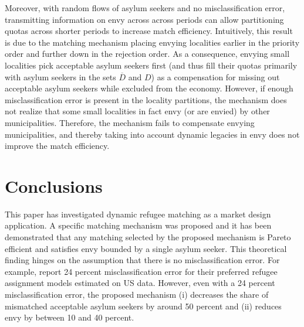 \documentclass[12pt,fleqn]{article}
\begin{document}
Moreover, with random flows of asylum seekers and no misclassification error, transmitting information on envy across across periods can allow partitioning quotas across shorter periods to increase match efficiency. Intuitively, this result is due to the matching mechanism placing envying localities earlier in the priority order and further down in the rejection order. As a consequence, envying small localities pick acceptable asylum seekers first (and thus fill their quotas primarily with asylum seekers in the sets $\overline{D}$ and $D$) as a compensation for missing out acceptable asylum seekers while excluded from the economy. However, if enough misclassification error is present in the locality partitions, the mechanism does not realize that some small localities in fact envy (or are envied) by other municipalities. Therefore, the mechanism fails to compensate envying municipalities, and thereby taking into account dynamic legacies in envy does not improve the match efficiency.

\section{Conclusions}\label{SEC:conclusions}
This paper has investigated dynamic refugee matching as a market design application. A specific matching mechanism was proposed and it has been demonstrated that any matching selected by the proposed mechanism is Pareto efficient and satisfies envy bounded by a single asylum seeker. This theoretical finding hinges on the assumption that there is no misclassification error. For example, \cite{bib:BansakEtAl} report 24 percent misclassification error for their preferred refugee assignment models estimated on US data. However, even with a 24 percent misclassification error, the proposed mechanism (i) decreases the share of mismatched acceptable asylum seekers by around 50 percent and (ii) reduces envy by between 10 and 40 percent.
\end{document}
